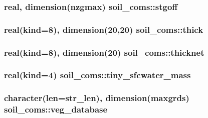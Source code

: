 \subsubsection[{\texorpdfstring{stgoff}{stgoff}}]{\setlength{\rightskip}{0pt plus 5cm}real, dimension(nzgmax) soil\+\_\+coms\+::stgoff}\hypertarget{namespacesoil__coms_abe490ee71d5f063358005df47f9dee38}{}\label{namespacesoil__coms_abe490ee71d5f063358005df47f9dee38}
\subsubsection[{\texorpdfstring{thick}{thick}}]{\setlength{\rightskip}{0pt plus 5cm}real(kind=8), dimension(20,20) soil\+\_\+coms\+::thick}\hypertarget{namespacesoil__coms_a5e41e535957c9e40c2836496d007477f}{}\label{namespacesoil__coms_a5e41e535957c9e40c2836496d007477f}
\subsubsection[{\texorpdfstring{thicknet}{thicknet}}]{\setlength{\rightskip}{0pt plus 5cm}real(kind=8), dimension(20) soil\+\_\+coms\+::thicknet}\hypertarget{namespacesoil__coms_a82fb9ea0980b1bf483abde43cb04cbd3}{}\label{namespacesoil__coms_a82fb9ea0980b1bf483abde43cb04cbd3}
\subsubsection[{\texorpdfstring{tiny\+\_\+sfcwater\+\_\+mass}{tiny_sfcwater_mass}}]{\setlength{\rightskip}{0pt plus 5cm}real(kind=4) soil\+\_\+coms\+::tiny\+\_\+sfcwater\+\_\+mass}\hypertarget{namespacesoil__coms_a15a18b26140182f9af4a448864b04663}{}\label{namespacesoil__coms_a15a18b26140182f9af4a448864b04663}
\subsubsection[{\texorpdfstring{veg\+\_\+database}{veg_database}}]{\setlength{\rightskip}{0pt plus 5cm}character(len=str\+\_\+len), dimension(maxgrds) soil\+\_\+coms\+::veg\+\_\+database}\hypertarget{namespacesoil__coms_a635e352f4923b8060b939ac82c23dbef}{}\label{namespacesoil__coms_a635e352f4923b8060b939ac82c23dbef}
